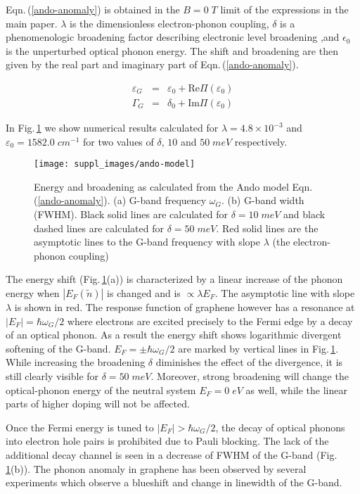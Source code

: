 \documentclass[pra,aps,superscriptaddress,preprint]{revtex4-1}
\begin{document}
\noindent
Eqn.\,(\ref{ando-anomaly}) is obtained in the $B=0\; T$ limit of the expressions in the main paper. $\lambda$ is the dimensionless electron-phonon coupling, $\delta$ is a phenomenologic broadening factor describing electronic level broadening ,and $\epsilon_0$ is the unperturbed optical phonon energy. The shift and broadening are then given by the real part and imaginary part of Eqn.\,(\ref{ando-anomaly}).

\noindent
\begin{eqnarray}
\label{ando-shift}
\varepsilon_G &=& \varepsilon_0 + \mathrm{Re}\Pi(\varepsilon_0) \\
\Gamma_G &=& \delta_0 + \mathrm{Im}\Pi(\varepsilon_0)
\end{eqnarray}

\noindent
In Fig.\,\ref{ando-model} we show numerical results calculated for $\lambda = 4.8\times 10^{-3}$ and $\varepsilon_0=1582.0\; cm^{-1}$ for two values of $\delta$, $10$ and $50\; meV$ respectively.
\begin{figure}[h]
   \texttt{[image: suppl\_images/ando-model]}
   \caption{\label{ando-model}Energy and broadening as calculated from the Ando model Eqn.\,(\ref{ando-anomaly}). (a) G-band frequency $\omega_G$. (b) G-band width (FWHM). Black solid lines are calculated for $\delta=10\; meV$ and black dashed lines are calculated for $\delta =50\; meV$. Red solid lines are the asymptotic lines to the G-band frequency with slope $\lambda$ (the electron-phonon coupling) }
\end{figure}
The energy shift (Fig.\,\ref{ando-model}(a)) is characterized by a linear increase of the phonon energy when $\left|E_F(\widetilde{n})\right|$ is changed and is $\propto \lambda E_F$. The asymptotic line with slope $\lambda$ is shown in red. The response function of graphene however has a resonance at $|E_F|=\hbar\omega_G /2$ where electrons are excited precisely to the Fermi edge by a decay of an optical phonon.
As a result the energy shift shows logarithmic divergent softening of the G-band. $E_F=\pm \hbar\omega_G /2$ are marked by vertical lines in Fig.\,\ref{ando-model}. While increasing the broadening $\delta$ diminishes the effect of the divergence, it is still clearly visible for $\delta =50\; meV$. Moreover, strong broadening will change the optical-phonon energy of the neutral system $E_F=0\; eV$ as well, while the linear parts of higher doping will not be affected.

Once the Fermi energy is tuned to $\left| E_F \right| >\hbar\omega_G /2$, the decay of optical phonons into electron hole pairs is prohibited due to Pauli blocking. The lack of the additional decay channel is seen in a decrease of FWHM of the G-band (Fig.\,\ref{ando-model}(b)). The phonon anomaly in graphene has been observed by several experiments \cite{pisana2007breakdown,yan2007electric} which observe a blueshift and change in linewidth of the G-band.
\end{document}
